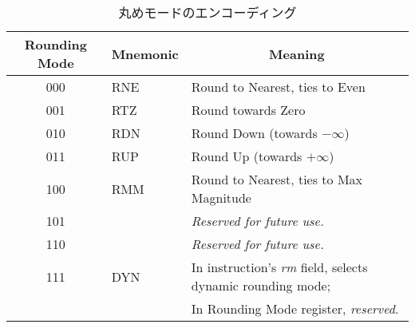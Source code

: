 \begin{table}[htp]
\begin{small}
\begin{center}
\begin{tabular}{ccl}
\hline
\multicolumn{1}{|c|}{Rounding Mode} &
\multicolumn{1}{c|}{Mnemonic} &
\multicolumn{1}{c|}{Meaning} \\
\hline
\multicolumn{1}{|c|}{000} &
\multicolumn{1}{l|}{RNE} &
\multicolumn{1}{l|}{Round to Nearest, ties to Even}\\
\hline
\multicolumn{1}{|c|}{001} &
\multicolumn{1}{l|}{RTZ} &
\multicolumn{1}{l|}{Round towards Zero}\\
\hline
\multicolumn{1}{|c|}{010} &
\multicolumn{1}{l|}{RDN} &
\multicolumn{1}{l|}{Round Down (towards $-\infty$)}\\
\hline
\multicolumn{1}{|c|}{011} &
\multicolumn{1}{l|}{RUP} &
\multicolumn{1}{l|}{Round Up (towards $+\infty$)}\\
\hline
\multicolumn{1}{|c|}{100} &
\multicolumn{1}{l|}{RMM} &
\multicolumn{1}{l|}{Round to Nearest, ties to Max Magnitude}\\
\hline
\multicolumn{1}{|c|}{101} &
\multicolumn{1}{l|}{} &
\multicolumn{1}{l|}{\em Reserved for future use.}\\
\hline
\multicolumn{1}{|c|}{110} &
\multicolumn{1}{l|}{} &
\multicolumn{1}{l|}{\em Reserved for future use.}\\
\hline
\multicolumn{1}{|c|}{111} &
\multicolumn{1}{l|}{DYN} &
\multicolumn{1}{l|}{In instruction's {\em rm} field, selects dynamic rounding mode;}\\
\multicolumn{1}{|c|}{} &
\multicolumn{1}{l|}{} &
\multicolumn{1}{l|}{In Rounding Mode register, {\em reserved}.}\\
\hline
\end{tabular}
\end{center}
\end{small}
\begin{comment}
\caption{Rounding mode encoding.}
\end{comment}
\caption{丸めモードのエンコーディング}
\label{rm}
\end{table}

